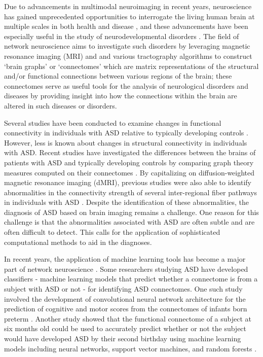 \documentclass[11pt,conference]{IEEEtran}
\begin{document}
Due to advancements in multimodal neuroimaging in recent years, neuroscience has gained 
unprecedented opportunities to interrogate the living human brain at multiple scales in 
both health and disease \cite{Hong.2019}, and these advancements have been especially 
useful in the study of neurodevelopmental disorders \cite{Nunes.2019}. The field of 
network neuroscience aims to investigate such disorders by leveraging magnetic resonance 
imaging (MRI) and and various tractography algorithms to construct `brain graphs' or 
`connectomes' which are matrix representations of the structural and/or functional 
connections between various regions of the brain; these connectomes serve as useful tools 
for the analysis of neurological disorders and diseases by providing insight into how 
the connections within the brain are altered in such diseases or disorders.

Several studies have been conducted to examine changes in functional connectivity in 
individuals with ASD relative to typically developing controls \cite{Lau.2019, Williams.2013}. 
However, less is known about changes in structural connectivity in individuals with ASD. 
Recent studies have investigated the differences between the brains of patients with ASD 
and typically developing controls by comparing graph theory measures computed on their
connectomes \cite{Roine.2015}. By capitalizing on diffusion-weighted magnetic resonance 
imaging (dMRI), previous studies were also able to identify abnormalities in the connectivity 
strength of several inter-regional fiber pathways in individuals with ASD \cite{dAlBbis.2018}. 
Despite the identification of these abnormalities, the diagnosis of ASD based on brain 
imaging remains a challenge. One reason for this challenge is that the abnormalities 
associated with ASD are often subtle and are often difficult to detect. This calls for the 
application of sophisticated computational methods to aid in the diagnoses.

In recent years, the application of machine learning tools has become a major part of 
network neuroscience \cite{Abos.2017,Vogt.2018}. Some researchers studying ASD have 
developed classifiers - machine learning models that predict whether a connectome is from 
a subject with ASD or not - for identifying ASD connectomes. One such study involved the 
development of convolutional neural network architecture for the prediction of cognitive 
and motor scores from the connectomes of infants born preterm \cite{Kawahara.2017}.
Another study showed that the functional connectome of a subject at six months old could 
be used to accurately predict whether or not the subject would have developed ASD by 
their second birthday using machine learning models including neural networks,
support vector machines, and random forests \cite{Horien.2022}.
\end{document}
